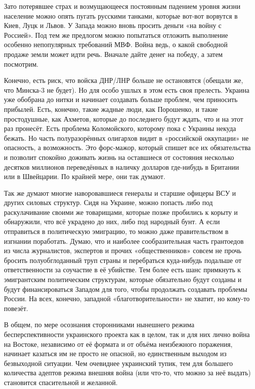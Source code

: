 Зато потерявшее страх и возмущающееся постоянным падением уровня жизни
население можно опять пугать русскими танками, которые вот-вот ворвутся в Киев,
Луцк и Львов. У Запада можно вновь просить деньги «на войну с Россией». Под тем
же предлогом можно попытаться отложить выполнение особенно непопулярных
требований МВФ. Война ведь, о какой свободной продаже земли может идти речь.
Вначале дайте денег на победу, а затем посмотрим.

Конечно, есть риск, что войска ДНР/ЛНР больше не остановятся (обещали же, что
Минска-3 не будет). Но для особо ушлых в этом есть своя прелесть. Украина уже
обобрана до нитки и начинает создавать больше проблем, чем приносить прибылей.
Есть, конечно, такие жадные люди, как Порошенко, и такие простодушные, как
Ахметов, которые до последнего будут ждать, что и на этот раз пронесёт. Есть
проблема Коломойского, которому пока с Украины некуда бежать. Но часть
полуразорённых олигархов видит в «российской оккупации» не опасность, а
возможность. Это форс-мажор, который спишет все их обязательства и позволит
спокойно доживать жизнь на оставшиеся от состояния несколько десятков миллионов
переведённых в наличку долларов где-нибудь в Британии или в Швейцарии. По
крайней мере, они так думают.

Так же думают многие наворовавшиеся генералы и старшие офицеры ВСУ и других
силовых структур. Сидя на Украине, можно попасть либо под раскулачивание своими
же товарищами, которые позже пробились к корыту и обнаружили, что всё украдено
до них, либо под народный бунт. А если отправиться в политическую эмиграцию, то
можно даже правительством в изгнании поработать. Думаю, что и наиболее
сообразительная часть грантоедов из числа журналистов, экспертов и прочих
«общественников» совсем не прочь бросить полуобглоданный труп страны и
перебраться куда-нибудь подальше от ответственности за соучастие в её убийстве.
Тем более есть шанс примкнуть к эмигрантским политическим структурам, которые
обязательно будут созданы и будут финансироваться Западом для того, чтобы
продолжать создавать проблемы России. На всех, конечно, западной
«благотворительности» не хватит, но кому-то повезёт.

В общем, по мере осознания сторонниками нынешнего режима бесперспективности
украинского проекта как в целом, так и для них лично война на Востоке,
независимо от её формата и от объёма неизбежного поражения, начинает казаться
им не просто не опасной, но единственным выходом из безвыходной ситуации. Чем
очевиднее украинский тупик, тем для большего количества адептов режима внешняя
война (или что-то, что можно за неё выдать) становится спасительной и желанной.

